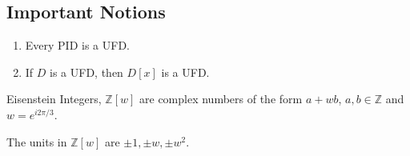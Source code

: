 \subsection{Important Notions}
\begin{enumerate}
	\item Every PID is a UFD.
	\item If $D$ is a UFD, then $D[x]$ is a UFD.
\end{enumerate}

\begin{definition}
	Eisenstein Integers, $\mathbb{Z}[w]$ are complex numbers of the form $a+wb$, $a,b \in \mathbb{Z}$ and $w = e^{i2\pi/3}$.
\end{definition}
	The units in $\mathbb{Z}[w]$ are $\pm 1, \pm w, \pm w^2$.

